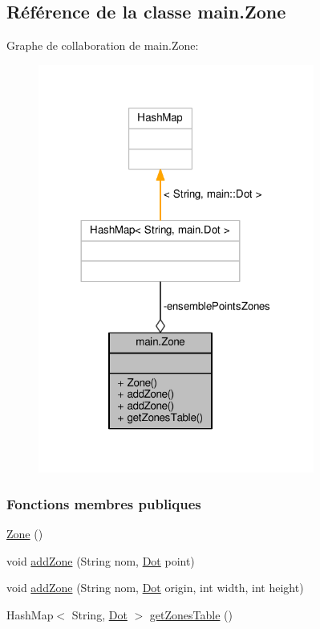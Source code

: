 \hypertarget{classmain_1_1Zone}{}\subsection{Référence de la classe main.\+Zone}
\label{classmain_1_1Zone}


Graphe de collaboration de main.\+Zone\+:\nopagebreak
\begin{figure}[H]
\begin{center}
\leavevmode
\includegraphics[width=257pt]{classmain_1_1Zone__coll__graph}
\end{center}
\end{figure}
\subsubsection*{Fonctions membres publiques}
\begin{DoxyCompactItemize}
\item 
\hyperlink{classmain_1_1Zone_a633f0646a67422bcdd7ec32fec759e73}{Zone} ()
\item 
void \hyperlink{classmain_1_1Zone_aca2ae8fb9f877dc813a6db162c03a1ba}{add\+Zone} (String nom, \hyperlink{classmain_1_1Dot}{Dot} point)
\item 
void \hyperlink{classmain_1_1Zone_a7a460d247b229143e610857eee1858c3}{add\+Zone} (String nom, \hyperlink{classmain_1_1Dot}{Dot} origin, int width, int height)
\item 
Hash\+Map$<$ String, \hyperlink{classmain_1_1Dot}{Dot} $>$ \hyperlink{classmain_1_1Zone_a3550ea1156f590b7f6ea9eb73d14d114}{get\+Zones\+Table} ()
\end{DoxyCompactItemize}
